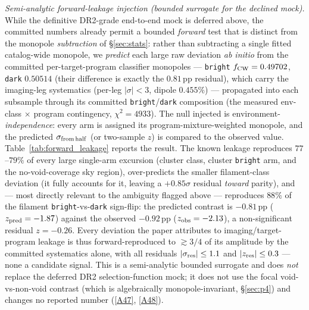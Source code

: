 \documentclass[twocolumn,linenumbers]{aastex702}
\newcommand{\repoBase}{https://github.com/Hubify-Projects/bigbounce/blob/main}
\begin{document}
\emph{Semi-analytic forward-leakage injection (bounded surrogate for the
declined mock).} While the definitive DR2-grade end-to-end mock is deferred
above, the committed numbers already permit a bounded \emph{forward} test that
is distinct from the monopole \emph{subtraction} of \S\ref{sec:stats}: rather
than subtracting a single fitted catalog-wide monopole, we \emph{predict} each
large raw deviation \emph{ab initio} from the committed per-target-program
classifier monopoles --- \texttt{bright} $f_{\rm CW}=0.49702$, \texttt{dark}
$0.50514$ (their difference is exactly the $0.81$\,pp residual), which carry the
imaging-leg systematics (per-leg $|\sigma|<3$, dipole $0.455\%$) --- propagated
into each subsample through its committed \texttt{bright}/\texttt{dark}
composition (the measured env-class $\times$ program contingency,
$\chi^2=4933$). The null injected is environment-\emph{independence}: every arm
is assigned its program-mixture-weighted monopole, and the predicted
$\sigma_{\rm from\,half}$ (or two-sample $z$) is compared to the observed value.
Table~\ref{tab:forward_leakage} reports the result. The known leakage reproduces
$77$--$79\%$ of every large single-arm excursion (cluster class, cluster
\texttt{bright} arm, and the no-void-coverage sky region), over-predicts the
smaller filament-class deviation (it fully accounts for it, leaving a
$+0.85\sigma$ residual \emph{toward} parity), and --- most directly relevant to
the ambiguity flagged above --- reproduces $88\%$ of the filament
\texttt{bright}-vs-\texttt{dark} sign-flip: the predicted contrast is
$-0.81$\,pp ($z_{\rm pred}=-1.87$) against the observed $-0.92$\,pp
($z_{\rm obs}=-2.13$), a non-significant residual $z=-0.26$. Every deviation the
paper attributes to imaging/target-program leakage is thus forward-reproduced to
$\gtrsim3/4$ of its amplitude by the committed systematics alone, with all
residuals $|\sigma_{\rm res}|\le1.1$ and $|z_{\rm res}|\le0.3$ --- none a
candidate signal. This is a semi-analytic bounded surrogate and does \emph{not}
replace the deferred DR2 selection-function mock; it does not use the focal
void-vs-non-void contrast (which is algebraically monopole-invariant,
\S\ref{sec:p4}) and changes no reported number
(\href{\repoBase/pipelines/p5\_desi\_chirality/analysis/forward\_leakage\_injection\_v0\_1\_141.py}{[A47]},
\href{\repoBase/pipelines/p5\_desi\_chirality/analysis/forward\_leakage\_injection\_v0\_1\_141.json}{[A48]}).
\end{document}
